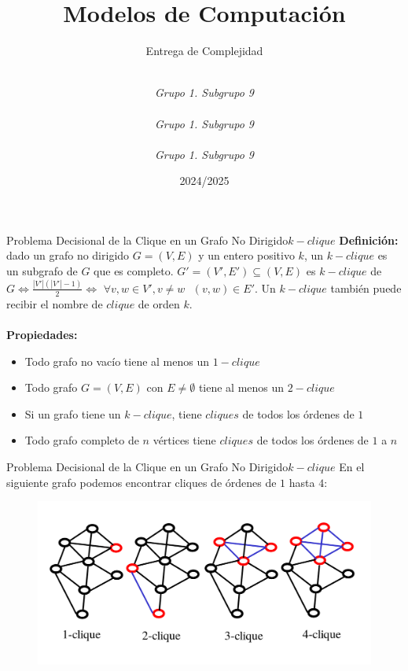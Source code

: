 \documentclass[10pt, envcountsect, presentation, aspectratio=169]{beamer}
\title[Nombre]{Modelos de Computación}
\subtitle{Entrega de Complejidad} %
\author[Carrillo G., Gallego J., Ibarrola Y.] %
{
	\sc{Ginés Carrillo Ibáñez}\\  %
	\textit{Grupo 1. Subgrupo 9}\\
	\sc{Juan Diego Gallego Nicolás}\\ %
	\textit{Grupo 1. Subgrupo 9}\\ 
	\sc{Yago Ibarrola Lapeña}\\ %
	\textit{Grupo 1. Subgrupo 9}\\ 
}
\institute[GII]%
{
	\textit{Universidad de Murcia}
}
\date{2024/2025} %
\begin{document}
	



\begin{frame}[plain]
	\titlepage
\end{frame}


\begin{frame}{Problema Decisional de la Clique en un Grafo No Dirigido}{$k-clique$}
    \textbf{Definición:} dado un grafo no dirigido $G=(V,E)$ y un entero positivo $k$, un $k-clique$ es un subgrafo de $G$ que es completo. $G'=(V',E') \subseteq (V,E)$ es $k-clique$ de $G \Leftrightarrow \frac{|V'|(|V'|-1)}{2} \Leftrightarrow$ $\forall v, w \in V', v \neq w \text{ } (v,w)\in E'$. Un $k-clique$ también puede recibir el nombre de $clique$ de orden $k$. \\~\\

    \textbf{Propiedades:}

    \begin{itemize}
        \item[] Todo grafo no vacío tiene al menos un $1-clique$
        \item[] Todo grafo $G=(V,E)$ con $E \neq \emptyset$ tiene al menos un $2-clique$
        \item[] Si un grafo tiene un $k-clique$, tiene $cliques$ de todos los órdenes de $1$ 
        \item[] Todo grafo completo de $n$ vértices tiene $cliques$ de todos los órdenes de $1$ a $n$
    \end{itemize}
    
\end{frame}

\begin{frame}{Problema Decisional de la Clique en un Grafo No Dirigido}{$k-clique$}
    En el siguiente grafo podemos encontrar cliques de órdenes de $1$ hasta $4$:
    \begin{figure}
        \includegraphics[scale=0.25]{images/T2_2_ejemploclique.png}
    \end{figure} 
\end{frame}
\end{document}
